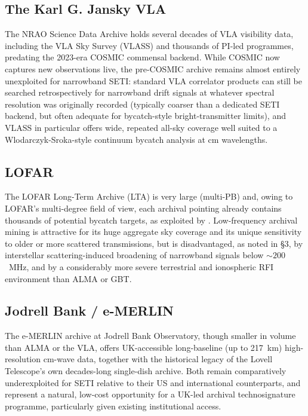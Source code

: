 \documentclass[10pt,twocolumn]{article}
\begin{document}
\subsection{The Karl G. Jansky VLA}
The NRAO Science Data Archive holds several decades of VLA visibility data, including the VLA Sky Survey (VLASS) and thousands of PI-led programmes, predating the 2023-era COSMIC commensal backend. While COSMIC now captures new observations live, the pre-COSMIC archive remains almost entirely unexploited for narrowband SETI: standard VLA correlator products can still be searched retrospectively for narrowband drift signals at whatever spectral resolution was originally recorded (typically coarser than a dedicated SETI backend, but often adequate for bycatch-style bright-transmitter limits), and VLASS in particular offers wide, repeated all-sky coverage well suited to a Wlodarczyk-Sroka-style continuum bycatch analysis at cm wavelengths.

\subsection{LOFAR}
The LOFAR Long-Term Archive (LTA) is very large (multi-PB) and, owing to LOFAR's multi-degree field of view, each archival pointing already contains thousands of potential bycatch targets, as exploited by \citet{johnson2023}. Low-frequency archival mining is attractive for its huge aggregate sky coverage and its unique sensitivity to older or more scattered transmissions, but is disadvantaged, as noted in \S3, by interstellar scattering-induced broadening of narrowband signals below $\sim200$~MHz, and by a considerably more severe terrestrial and ionospheric RFI environment than ALMA or GBT.

\subsection{Jodrell Bank / e-MERLIN}
The e-MERLIN archive at Jodrell Bank Observatory, though smaller in volume than ALMA or the VLA, offers UK-accessible long-baseline (up to 217~km) high-resolution cm-wave data, together with the historical legacy of the Lovell Telescope's own decades-long single-dish archive. Both remain comparatively underexploited for SETI relative to their US and international counterparts, and represent a natural, low-cost opportunity for a UK-led archival technosignature programme, particularly given existing institutional access.
\end{document}
